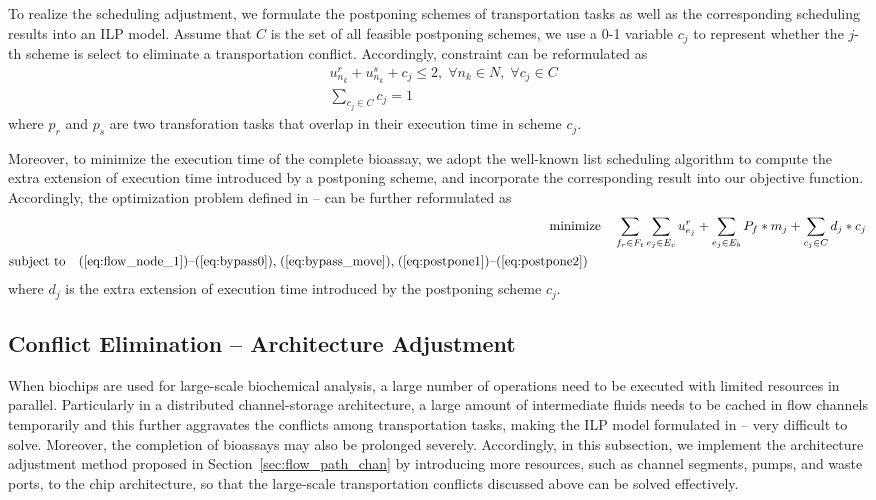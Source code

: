 To realize the scheduling adjustment, we formulate the postponing schemes of transportation tasks as well as the corresponding scheduling results into an ILP model. Assume that $C$ is the set of all feasible postponing schemes, we use a 0-1 variable $c_j$ to represent whether the $j$-th scheme is select to eliminate a transportation conflict. Accordingly, constraint \text{(\ref{eq:nonconflict})} can be reformulated as
\begin{align}
& u^r_{n_k} + u^s_{n_k} + c_j \leq 2, \; \forall n_k\in N, \; \forall c_j\in C \label{eq:postpone1} \\
& \sum_{c_j\in C}c_j = 1 \label{eq:postpone2}
\end{align}
where $p_r$ and $p_s$ are two transforation tasks that overlap in their execution time in scheme $c_j$.

Moreover, to minimize the execution time of the complete bioassay, we adopt the well-known list scheduling algorithm \cite{lawler1993sequencing} to compute the extra extension of execution time introduced by a postponing scheme, and incorporate the corresponding result into our objective function. Accordingly, the optimization problem defined in \text{(\ref{eq:ILP_flow_paths_deadlock})}--\text{(\ref{eq:ILP_flow_paths_deadlock_last})} can be further reformulated as
\begin{align}\label{eq:ILP_flow_paths_deadlock_postpone}
\text{minimize} & \quad \sum_{f_r\in F_t} \sum_{e_j\in E_c} u^r_{e_j}
+ \sum_{e_j \in E_b} P_f * m_j + \sum_{c_j \in C} d_j * c_j \\\label{eq:ILP_flow_paths_deadlock_postpone_last}
 \begin{split}
\text{subject to} & \quad
\text{(\ref{eq:flow_node_1})--(\ref{eq:bypass0}),\;(\ref{eq:bypass_move}),\;(\ref{eq:postpone1})--(\ref{eq:postpone2})}
 \end{split}
\end{align}
where $d_j$ is the extra extension of execution time  introduced by the postponing scheme $c_j$.

\subsection{Conflict Elimination -- Architecture Adjustment}\label{sec:GA}

When biochips are used for large-scale biochemical analysis, a large number of operations need to be executed with limited resources in parallel. Particularly in a distributed channel-storage architecture, a large amount of intermediate fluids needs to be cached in flow channels temporarily and this further aggravates the conflicts among transportation tasks, making the ILP model formulated in \text{(\ref{eq:ILP_flow_paths_deadlock_postpone})}--\text{(\ref{eq:ILP_flow_paths_deadlock_postpone_last})} very difficult to solve. Moreover, the completion of bioassays may also be prolonged severely. Accordingly, in this subsection, we implement the architecture adjustment method proposed in Section~\ref{sec:flow_path_chan} by introducing more resources, such as channel segments, pumps, and waste ports, to the chip architecture, so that the large-scale transportation conflicts discussed above can be solved effectively.

